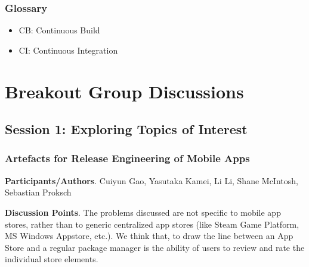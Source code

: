 \documentclass[a4paper]{article}
\newcommand{\smallsection}[1]{\noindent \textbf{#1}. }
\begin{document}
\subsubsection{Glossary}

\begin{itemize}
\item CB: Continuous Build
\item CI: Continuous Integration
\end{itemize}
\clearpage

\section{Breakout Group Discussions}

\subsection{Session 1: Exploring Topics of Interest}

\subsubsection{Artefacts for Release Engineering of Mobile Apps}

\smallsection{Participants/Authors}
Cuiyun Gao, Yasutaka Kamei, Li Li, Shane McIntosh, Sebastian Proksch

\smallsection{Discussion Points}
The problems discussed are not specific to mobile app stores, rather than to generic centralized app stores (like Steam Game Platform, MS Windows Appstore, etc.). We think that, to draw the line between an App Store and a regular package manager is the ability of users to review and rate the individual store elements.
\end{document}
